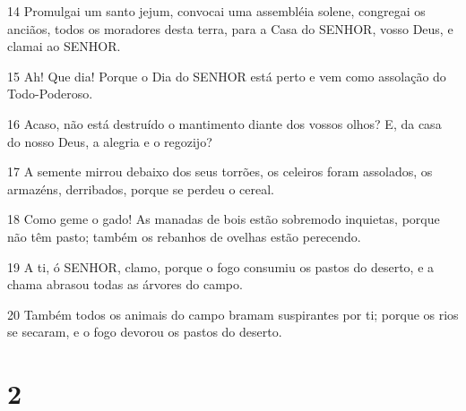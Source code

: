\par 14 Promulgai um santo jejum, convocai uma assembléia solene, congregai os anciãos, todos os moradores desta terra, para a Casa do SENHOR, vosso Deus, e clamai ao SENHOR.
\par 15 Ah! Que dia! Porque o Dia do SENHOR está perto e vem como assolação do Todo-Poderoso.
\par 16 Acaso, não está destruído o mantimento diante dos vossos olhos? E, da casa do nosso Deus, a alegria e o regozijo?
\par 17 A semente mirrou debaixo dos seus torrões, os celeiros foram assolados, os armazéns, derribados, porque se perdeu o cereal.
\par 18 Como geme o gado! As manadas de bois estão sobremodo inquietas, porque não têm pasto; também os rebanhos de ovelhas estão perecendo.
\par 19 A ti, ó SENHOR, clamo, porque o fogo consumiu os pastos do deserto, e a chama abrasou todas as árvores do campo.
\par 20 Também todos os animais do campo bramam suspirantes por ti; porque os rios se secaram, e o fogo devorou os pastos do deserto.

\chapter{2}

